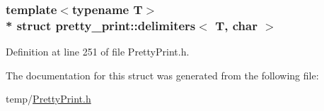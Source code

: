 \subsubsection*{template$<$typename T$>$\\*
struct pretty\+\_\+print\+::delimiters$<$ T, char $>$}



Definition at line 251 of file Pretty\+Print.\+h.



The documentation for this struct was generated from the following file\+:\begin{DoxyCompactItemize}
\item 
temp/\hyperlink{PrettyPrint_8h}{Pretty\+Print.\+h}\end{DoxyCompactItemize}
